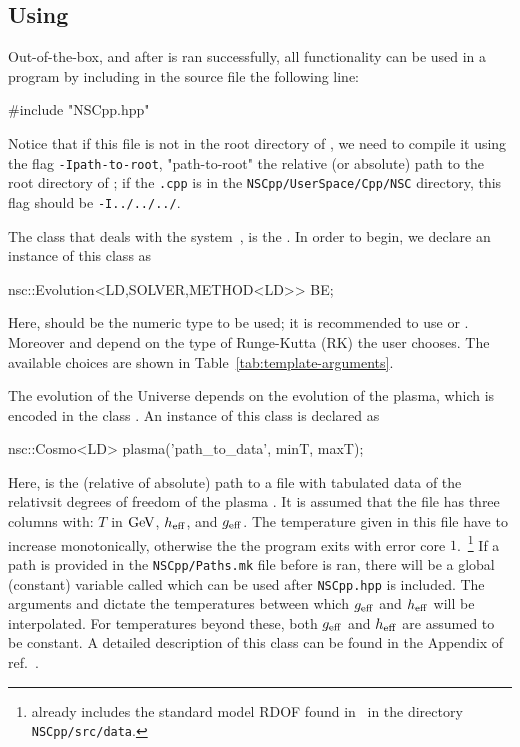 \documentclass[11pt,a4paper]{article}
\begin{document}
\subsection{Using \nsc}\label{sec:Cpp_usage} 
%
Out-of-the-box, and after  is ran successfully, all \nsc functionality can be used in a \CPP program by including in the source file the following line:
%
\begin{cpp}
	#include "NSCpp.hpp"
\end{cpp}
%
Notice that if this file is not in the root directory of \nsc, we need to compile it using the flag {\tt -Ipath-to-root}, "path-to-root" the relative (or absolute) path to the root directory of \nsc; \eg if the {\tt .cpp} is in the {\tt NSCpp/UserSpace/Cpp/NSC} directory, this flag should be {\tt -I../../../}. 

 
The class that deals with the system~, is the . In order to begin, we declare an instance of this class as
%
\begin{cpp}
    nsc::Evolution<LD,SOLVER,METHOD<LD>> BE;
\end{cpp}
%
Here,  should be the numeric type to be used; it is recommended to use  or . Moreover  and  depend on the type of Runge-Kutta (RK) the user chooses. The available choices are shown in Table~\ref{tab:template-arguments}. 

The evolution of the Universe depends on the evolution of the plasma, which is encoded in the class . An instance of this class is declared as 
%
\begin{cpp}
	nsc::Cosmo<LD> plasma('path_to_data', minT, maxT);
\end{cpp}
%
Here,  is the (relative of absolute) path to a file with tabulated data  of the relativsit degrees of freedom of the plasma . It is assumed that the file has three columns with: $T$ in ${\rm GeV}$, $h_{\rm eff}{}$, and $g_{\rm eff}{}$. The temperature given in this file have to increase monotonically, otherwise the the program exits with error core $1$.~\footnote{\nsc already includes the standard model RDOF found in~\cite{Saikawa:2020swg} in the directory {\tt NSCpp/src/data}.} If a path is provided in the {\tt NSCpp/Paths.mk} file before  is ran, there will be a global (constant) variable called  which can be used after  {\tt NSCpp.hpp} is included.
%
The arguments  and  dictate the temperatures between which $g_{\rm eff}{}$ and $h_{\rm eff}{}$ will be interpolated. For temperatures beyond these, both  $g_{\rm eff}{}$ and $h_{\rm eff}{}$  are assumed to be constant. A detailed description of this class can be found in the Appendix of ref.~\cite{Karamitros:2021nxi}.  
\end{document}

